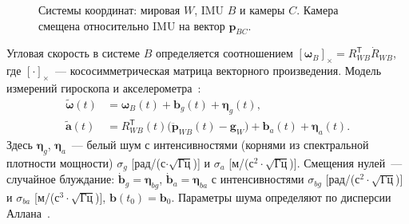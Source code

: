 \documentclass{misisarticle}
\newcommand{\cross}[1]{[#1]_{\times}}
\newcommand{\T}{^{\mathsf{T}}}
\newcommand{\vb}[1]{\mathbf{#1}}
\begin{document}
\begin{figure}[htbp]
  \centering
  \caption{Системы координат: мировая $W$, IMU $B$ и камеры $C$. Камера смещена относительно IMU на вектор $\vb p_{BC}$.}
  \label{fig:frames}
\end{figure}

Угловая скорость в системе $B$ определяется соотношением $\cross{\boldsymbol\omega_B}=R_{WB}\T\dot R_{WB}$, где $\cross{\cdot}$~--- кососимметрическая матрица векторного произведения. Модель измерений гироскопа и акселерометра~\cite{forster, furgale}:
\begin{align}
  \tilde{\boldsymbol\omega}(t) &= \boldsymbol\omega_B(t) + \vb b_g(t) + \boldsymbol\eta_g(t), \label{eq:gyro}\\
  \tilde{\vb a}(t) &= R_{WB}\T(t)\bigl(\ddot{\vb p}_{WB}(t)-\vb g_W\bigr) + \vb b_a(t) + \boldsymbol\eta_a(t). \label{eq:acc}
\end{align}
Здесь $\boldsymbol\eta_g$, $\boldsymbol\eta_a$~--- белый шум с интенсивностями (корнями из спектральной плотности мощности) $\sigma_g$ [рад/(с$\cdot\sqrt{\text{Гц}}$)] и $\sigma_a$ [м/(с$^2\cdot\sqrt{\text{Гц}}$)]. Смещения нулей~--- случайное блуждание: $\dot{\vb b}_g=\boldsymbol\eta_{bg}$, $\dot{\vb b}_a=\boldsymbol\eta_{ba}$ с интенсивностями $\sigma_{bg}$ [рад/(с$^2\cdot\sqrt{\text{Гц}}$)] и $\sigma_{ba}$ [м/(с$^3\cdot\sqrt{\text{Гц}}$)], $\vb b(t_0)=\vb b_0$. Параметры шума определяют по дисперсии Аллана~\cite{ieee952}.
\end{document}
